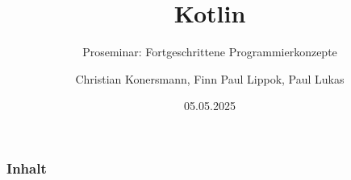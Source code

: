 \documentclass{beamer}
\title{Kotlin}
\subtitle{Proseminar: Fortgeschrittene Programmierkonzepte}
\author[C. Konersmann, F. P. Lippok, P. Lukas]{
  Christian Konersmann, Finn Paul Lippok, Paul Lukas
}
\date{05.05.2025}
\begin{document}
\frame{\titlepage}
\begin{frame}
  \frametitle{Inhalt}
  \tableofcontents
\end{frame}
\end{document}
